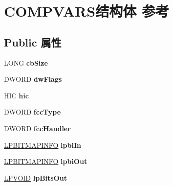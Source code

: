 \hypertarget{struct_c_o_m_p_v_a_r_s}{}\section{C\+O\+M\+P\+V\+A\+R\+S结构体 参考}
\label{struct_c_o_m_p_v_a_r_s}
\subsection*{Public 属性}
\begin{DoxyCompactItemize}
\item 
\mbox{\label{struct_c_o_m_p_v_a_r_s_a790fa530fcdf433b4eb3aa960653734a}} 
L\+O\+NG {\bfseries cb\+Size}
\item 
\mbox{\label{struct_c_o_m_p_v_a_r_s_a1054e1f985fbda06cdd6d8524f9e2607}} 
D\+W\+O\+RD {\bfseries dw\+Flags}
\item 
\mbox{\label{struct_c_o_m_p_v_a_r_s_aa259e895c2961d8128a11eda52770a78}} 
H\+IC {\bfseries hic}
\item 
\mbox{\label{struct_c_o_m_p_v_a_r_s_ad84f3c5f32d4f747e7a47e365d3fd285}} 
D\+W\+O\+RD {\bfseries fcc\+Type}
\item 
\mbox{\label{struct_c_o_m_p_v_a_r_s_a628448a02a122b91de3e6c9fe00f333f}} 
D\+W\+O\+RD {\bfseries fcc\+Handler}
\item 
\mbox{\label{struct_c_o_m_p_v_a_r_s_aea4a397b24500a41af96e1856e0b6e29}} 
\hyperlink{structtag_b_i_t_m_a_p_i_n_f_o}{L\+P\+B\+I\+T\+M\+A\+P\+I\+N\+FO} {\bfseries lpbi\+In}
\item 
\mbox{\label{struct_c_o_m_p_v_a_r_s_a7b4fa6c3cf9dde88c8a43a19011b445b}} 
\hyperlink{structtag_b_i_t_m_a_p_i_n_f_o}{L\+P\+B\+I\+T\+M\+A\+P\+I\+N\+FO} {\bfseries lpbi\+Out}
\item 
\mbox{\label{struct_c_o_m_p_v_a_r_s_ab299d5b1568d72b7237d2b274e37216b}} 
\hyperlink{interfacevoid}{L\+P\+V\+O\+ID} {\bfseries lp\+Bits\+Out}
\item 
\mbox{\label{struct_c_o_m_p_v_a_r_s_a398458738160f02581560b0f3aa56c8e}} 

\end{DoxyCompactItemize}

